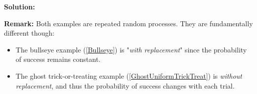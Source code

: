 \documentclass[12pt]{amsart}
\begin{document}
{\textbf{Solution:}




\newpage

\textbf{Remark:} Both examples are repeated random processes. They are fundamentally different though: \newline
\begin{itemize}
\item The bullseye example (\ref{Bullseye}) is "\textit{with replacement}" since the probability of success remains constant.
\item The ghost trick-or-treating example (\ref{GhostUniformTrickTreat}) is \textit{without replacement}, and thus the probability of success changes with each trial.
\end{itemize}

 


}  %
\end{document}
